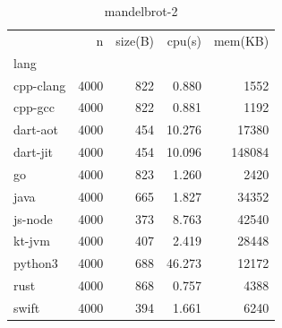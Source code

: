 \begin{table}[ht]
    \caption{mandelbrot-2}
    \label{tab:mandelbrot-2}
    \begin{center}
        \begin{tabular}{lrrrr}
            \toprule
            {}        & n    & size(B) & cpu(s) & mem(KB) \\
            lang      &      &         &        &         \\
            \midrule
            cpp-clang & 4000 & 822     & 0.880  & 1552    \\
            cpp-gcc   & 4000 & 822     & 0.881  & 1192    \\
            dart-aot  & 4000 & 454     & 10.276 & 17380   \\
            dart-jit  & 4000 & 454     & 10.096 & 148084  \\
            go        & 4000 & 823     & 1.260  & 2420    \\
            java      & 4000 & 665     & 1.827  & 34352   \\
            js-node   & 4000 & 373     & 8.763  & 42540   \\
            kt-jvm    & 4000 & 407     & 2.419  & 28448   \\
            python3   & 4000 & 688     & 46.273 & 12172   \\
            rust      & 4000 & 868     & 0.757  & 4388    \\
            swift     & 4000 & 394     & 1.661  & 6240    \\
            \bottomrule
        \end{tabular}
    \end{center}
\end{table}

